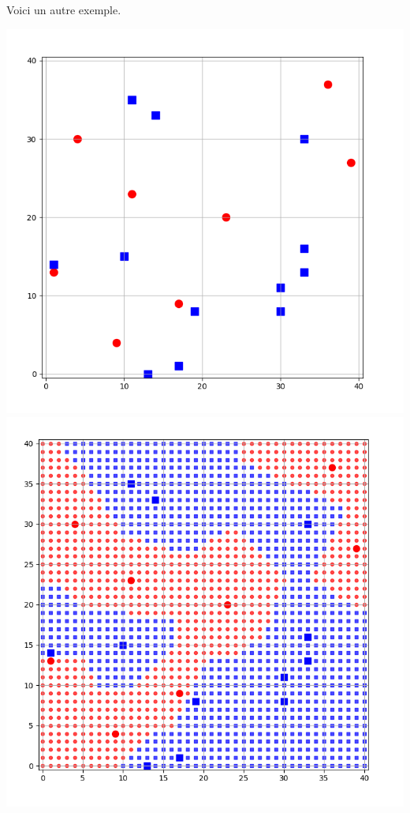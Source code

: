 \documentclass[10pt,class=report,crop=false]{standalone}
\begin{document}
\begin{activite}
\begin{enumerate}
	Voici un autre exemple.
	\begin{center}
	\includegraphics[scale=\myscale,scale=0.25]{ecran-voisins-6} \quad
	\includegraphics[scale=\myscale,scale=0.25]{ecran-voisins-7}
	\end{center}	
	

\end{enumerate}
\end{activite}
\end{document}

